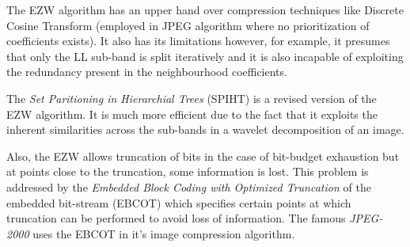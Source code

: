 \documentclass[./A14_Report.tex]{subfiles}
\begin{document}
The EZW algorithm has an upper hand over compression techniques like Discrete
Cosine Transform (employed in JPEG algorithm where no prioritization of
coefficients exists). It also has its limitations however, for example, it
presumes that only the LL sub-band is split iteratively and it is also
incapable of exploiting the redundancy present in the neighbourhood
coefficients.

The \textit{Set Paritioning in Hierarchial Trees} (SPIHT) is a revised version
of the EZW algorithm. It is much more efficient due to the fact that it
exploits the inherent similarities across the sub-bands in a wavelet
decomposition of an image. \cite{sayood_datac}

\par

Also, the EZW allows truncation of bits in the case of bit-budget exhaustion
but at points close to the truncation, some information is lost. This problem
is addressed by the \textit{Embedded Block Coding with Optimized Truncation} of
the embedded bit-stream (EBCOT) which specifies certain points at which
truncation can be performed to avoid loss of information. The famous
\textit{JPEG-2000} uses the EBCOT in it's image compression algorithm. \cite{sayood_datac}
\end{document}
